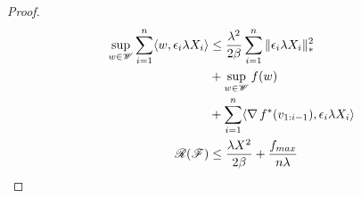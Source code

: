 \begin{frame}
  \begin{proof}
    \begin{align*}
      \sup_{w \in \mathscr{W}} \sum_{i=1}^n \langle {w} , {\epsilon_i \lambda X_i} \rangle & \le \frac{\lambda^2}{2\beta}\sum_{i=1}^n \|\epsilon_i \lambda X_i\|_{*}^2 \\
      & + \sup_{w \in \mathscr{W}} f(w) \\
      & + \sum_{i=1}^n \langle {\operatorname{\nabla}{f}^{*}(v_{1:i-1})} , {\epsilon_i \lambda X_i} \rangle \\
      \operatorname{\mathscr{R}}(\operatorname{\mathscr{F}}) & \le \frac{\lambda X^2}{2\beta} + \frac{f_{max}}{n\lambda}
    \end{align*}
  \end{proof}
\end{frame}
